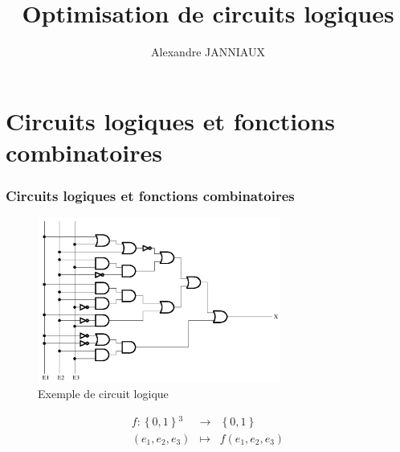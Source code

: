 \documentclass[handout]{beamer}
\title{Optimisation de circuits logiques}
\author{Alexandre JANNIAUX}
\newcommand{\ensemble}[1]{\left\lbrace{} #1 \right\rbrace{}}
\begin{document}
\begin{frame}
  \maketitle
  \tableofcontents
\end{frame}

\section{Circuits logiques et fonctions combinatoires}
\begin{frame}
  \frametitle{Circuits logiques et fonctions combinatoires}
  \begin{figure}[p]
    \includegraphics[width=8cm]{circuit_logique.png}
    \caption{Exemple de circuit logique}
    \label{fig:circ1}
  \end{figure}
  
  \[ \begin{aligned}
    f: \ensemble{0,1}^3 &\longrightarrow & \ensemble{0,1} \\
    (e_1,e_2,e_3) & \longmapsto & f(e_1,e_2,e_3) 
  \end{aligned}
  \]
  
  \begin{figure}[p]
%    
  \end{figure}
  

  
\end{frame}
\end{document}
